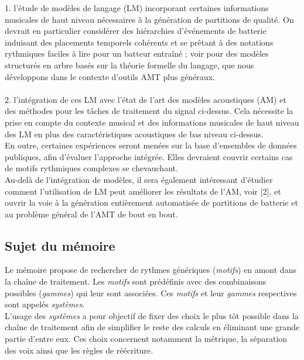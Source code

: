 1. l'étude de modèles de langage (LM) incorporant certaines informations musicales de haut niveau nécessaires à la génération de partitions de qualité. On devrait en particulier considérer des hiérarchies d'événements de batterie induisant des placements temporels cohérents et se prêtant à des notations rythmiques faciles à lire pour un batteur entraîné ; voir \cite{foscarin:hal-01988990} pour des modèles structurés en arbre basés sur la théorie formelle du langage, que nous développons dans le contexte d'outils AMT plus généraux.\\\\
2. l'intégration de ces LM avec l'état de l'art des modèles acoustiques (AM) et des méthodes pour les tâches de traitement du signal ci-dessus. Cela nécessite la prise en compte du contexte musical et des informations musicales de haut niveau des LM en plus des caractéristiques acoustiques de bas niveau ci-dessus.\\
En outre, certaines expériences seront menées sur la base d'ensembles de données publiques, afin d'évaluer l'approche intégrée. Elles devraient couvrir certains cas de motifs rythmiques complexes se chevauchant.\\

Au-delà de l'intégration de modèles, il sera également intéressant d'étudier comment l'utilisation de LM peut améliorer les résultats de l'AM, voir [2], et ouvrir la voie à la génération entièrement automatisée de partitions de batterie et au problème général de l'AMT de bout en bout.
\cite{8350302}
\subsection*{Sujet du mémoire}
Le mémoire propose de rechercher de rythmes génériques (\textit{motifs}) en amont dans la chaîne de traitement. Les \textit{motifs} sont prédéfinis avec des combinaisons possibles (\textit{gammes}) qui leur sont associées. Ces \textit{motifs} et leur \textit{gammes} respectives sont appelés \textit{systèmes}.\\L’usage des \textit{systèmes} a pour objectif de fixer des choix le plus tôt possible dans la chaîne de traitement afin de simplifier le reste des calculs en éliminant une grande partie d’entre eux. Ces choix concernent notamment la métrique, la séparation des voix ainsi que les règles de réécriture.
